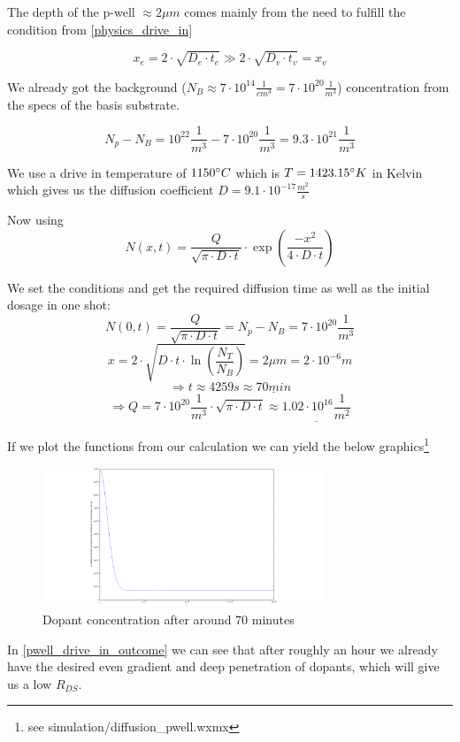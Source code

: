 The depth of the p-well $\approx 2 \mu m$ comes mainly from the need to fulfill the condition from \autoref{physics_drive_in}

\begin{equation}
x_e = 2 \cdot \sqrt{D_e \cdot t_e} \gg 2 \cdot \sqrt{D_v \cdot t_v} = x_v
\end{equation}

\newpage

We already got the background ($N_B \approx 7 \cdot 10^{14} \frac{1}{cm^3}=7 \cdot 10^{20} \frac{1}{m^3}$) concentration from the specs of the basis substrate.

\begin{equation}
N_p - N_B = 10^{22}\frac{1}{m^3} - 7 \cdot 10^{20} \frac{1}{m^3} = 9.3 \cdot 10^{21} \frac{1}{m^3}
\end{equation}

We use a drive in temperature of $1150 \degree C$ which is  $T = 1423.15 \degree K$ in Kelvin which gives us the diffusion coefficient $D=9.1 \cdot 10^{-17}  \frac{m^2}{s}$

Now using
\begin{equation}
N(x,t)
=
\frac{Q}{\sqrt{\pi\cdot D \cdot t}} \cdot \exp\left(\frac{-x^2}{4 \cdot D \cdot t}\right)
\end{equation}

We set the conditions and get the required diffusion time as well as the initial dosage in one shot:
\begin{equation}
N(0,t)
=
\frac{Q}{\sqrt{\pi\cdot D \cdot t}}
=
N_p-N_B
=
7 \cdot 10^{20} \frac{1}{m^3}
\end{equation}
\begin{equation}
x
=
2 \cdot \sqrt{D \cdot t \cdot\ln\left(\frac{N_T}{N_B}\right)}
=
2 \mu m
=
2 \cdot 10^{-6} m
\end{equation}
\begin{equation}
\Rightarrow
t \approx 4259s \approx \underline{70 min}
\end{equation}
\begin{equation}
\Rightarrow
Q
=
7 \cdot 10^{20} \frac{1}{m^3} \cdot \sqrt{\pi\cdot D \cdot t}
\approx
\underline{1.02 \cdot 10^{16} \frac{1}{m^2}}
\end{equation}

If we plot the functions from our calculation we can yield the below graphics\footnote{see simulation/diffusion\_pwell.wxmx}

\begin{figure}[H]
	\centering
	\includegraphics[width=0.75\textwidth]{p-well-diffusion.png}
	\caption{Dopant concentration after around 70 minutes}
	\label{pwell_drive_in_outcome}
\end{figure}

In \autoref{pwell_drive_in_outcome} we can see that after roughly an hour we already have the desired even gradient and deep penetration of dopants, which will give us a low $R_{DS}$.